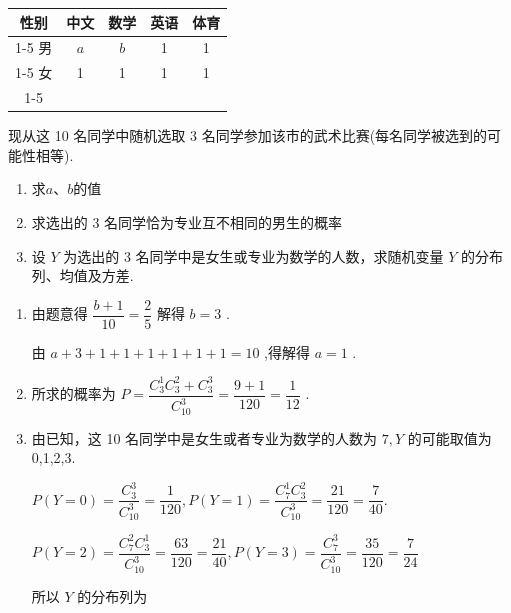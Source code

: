 \begin{enumerate}
\begin{enumerate}
    \begin{center}
    \begin{tabular}{|c|c|c|c|c|}
    \hline
    性别 & 中文 & 数学 & 英语 & 体育 \\
    \cline{1-5}
    男 & $a$ & $b$ & 1 & 1 \\
    \cline{1-5}
    女 & 1 & 1 & 1 & 1 \\
    \cline{1-5}
    \hline
    \end{tabular}
    \end{center}
    
    现从这 10 名同学中随机选取 3 名同学参加该市的武术比赛(每名同学被选到的可能性相等).
    \begin{enumerate}
        \item 求$a$、$b$的值
        
        \item 求选出的 3 名同学恰为专业互不相同的男生的概率
        
        \item 设 $Y$ 为选出的 3 名同学中是女生或专业为数学的人数，求随机变量 $Y$ 的分布列、均值及方差.
    \end{enumerate}
    \begin{jieda}
        \begin{enumerate}
            \item 由题意得 $\dfrac{b + 1}{10} = \dfrac{2}{5}$ 解得 $b = 3$ .
            
            由 $a + 3 + 1 + 1 + 1 + 1 + 1 + 1 = {10}$ ,得解得 $a = 1$ .
            
            \item 所求的概率为 $P = \dfrac{{{C}}_{3}^{1}{{C}}_{3}^{2} + {{C}}_{3}^{3}}{{{C}}_{10}^{3}} = \dfrac{9 + 1}{120} = \dfrac{1}{12}$ .
            
            \item 由已知，这 10 名同学中是女生或者专业为数学的人数为 $7,Y$ 的可能取值为0,1,2,3.
            
            $P\left( {Y = 0}\right)  = \dfrac{C_{3}^{3}}{C_{10}^{3}} = \dfrac{1}{120},P\left( {Y = 1}\right)  = \dfrac{C_{7}^{1}C_{3}^{2}}{C_{10}^{3}} = \dfrac{21}{120} = \dfrac{7}{40}.$
            
            $P\left( {Y = 2}\right)  = \dfrac{C_{7}^{2}C_{3}^{1}}{C_{10}^{3}} = \dfrac{63}{120} = \dfrac{21}{40},P\left( {Y = 3}\right)  = \dfrac{C_{7}^{3}}{C_{10}^{3}} = \dfrac{35}{120} = \dfrac{7}{24}$
            
            所以 $Y$ 的分布列为
            

\end{enumerate}
\end{jieda}
\end{enumerate}
\end{enumerate}
